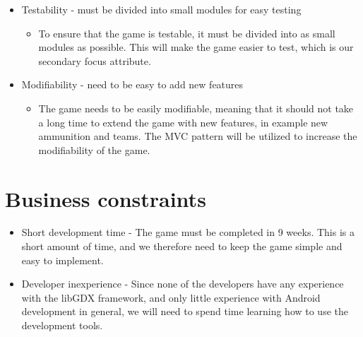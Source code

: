 \begin{itemize}
\item{Testability - must be divided into small modules for easy testing}
	\begin{itemize}
		\item{To ensure that the game is testable, it must be divided into as small modules as possible. This will make the game easier to test, which is our secondary focus attribute.}
	\end{itemize}
	\item{Modifiability - need to be easy to add new features}
	\begin{itemize}
	\item{The game needs to be easily modifiable, meaning that it should not take a long time to extend the game with new features, in example new ammunition and teams. The MVC pattern will be utilized to increase the modifiability of the game.}
	\end{itemize}
\end{itemize}

\section{Business constraints}

\begin{itemize}
\item{Short development time - The game must be completed in 9 weeks. This is a short amount of time, and we therefore need to keep the game simple and easy to implement.}
\item{Developer inexperience - Since none of the developers have any experience with the libGDX framework, and only little experience with Android development in general, we will need to spend time learning how to use the development tools.}
\end{itemize}